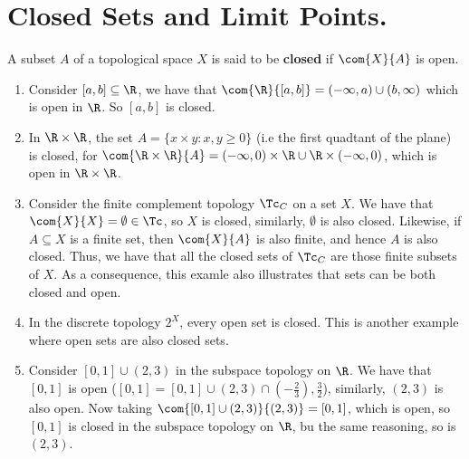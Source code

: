 
\section{Closed Sets and Limit Points.}

\begin{definition}
    A subset $A$ of a topological space  $X$ is said to be  \textbf{closed} if
    $\com{X}{A}$ is open.		
\end{definition}

\begin{example}
    \begin{enumerate}[label=(\arabic*)]
        \item Consider $[a,b] \subseteq \R$, we have that
            $\com{\R}{[a,b]}=(-\infty,a) \cup (b, \infty)$ which is open in
            $\R$. So  $[a,b]$ is closed.

        \item In  $\R \times \R$, the set  $A=\{x \times y: x,y \geq 0\}$  (i.e
            the first quadtant of the plane) is closed, for $\com{\R \times
            \R}{A}=(- \infty,0) \times \R \cup \R \times (-\infty,0)$, which is
            open in $\R \times \R$.

        \item Consider the finite complement topology $\Tc_C$ on a set  $X$. We
            have that  $\com{X}{X}=\emptyset \in \Tc$, so  $X$ is closed,
            similarly,  $\emptyset$ is also closed. Likewise, if  $A \subseteq
            X$ is a finite set, then  $\com{X}{A}$ is also finite, and hence $A$
            is also closed. Thus, we have that all the closed sets of  $\Tc_C$
            are those finite subsets of  $X$. As a consequence, this examle also
            illustrates that sets can be both closed and open.

        \item In the discrete topology  $2^X$, every open set is closed. This is
            another example where open sets are also closed sets.

        \item Consider  $[0,1] \cup (2,3)$ in the subspace topology on $\R$. We
            have that  $[0,1]$ is open  ($[0,1]=[0,1] \cup (2,3) \cap
            (-\frac{2}{3}),\frac{3}{2}$), similarly, $(2,3)$ is also open. Now
            taking  $\com{[0,1] \cup (2,3)}{(2,3)}=[0,1]$, which is open, so
            $[0,1]$ is closed in the subspace topology on  $\R$, bu the same
            reasoning, so is  $(2,3)$.
    \end{enumerate}		
\end{example} 

